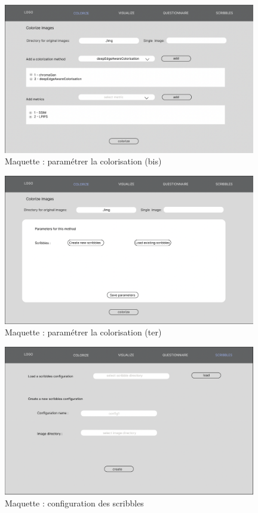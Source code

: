 \documentclass{article}
\begin{document}
\begin{figure}[htp]
    \centering
    \includegraphics[width=11cm]{coloriser-parametrage2.png}
    \caption{Maquette : paramétrer la colorisation (bis)}
    \label{fig:maquette-coloriser-parametrage2}
\end{figure}

\begin{figure}[htp]
    \centering
    \includegraphics[width=11cm]{coloriser-parametrage3.png}
    \caption{Maquette : paramétrer la colorisation (ter)}
    \label{fig:maquette-coloriser-parametrage3}
\end{figure}


\begin{figure}[htp]
    \centering
    \includegraphics[width=11cm]{coloriser-scribbles-configuration.png}
    \caption{Maquette : configuration des scribbles}
    \label{fig:maquette-coloriser-scribbles-configuration}
\end{figure}   
\end{document}

